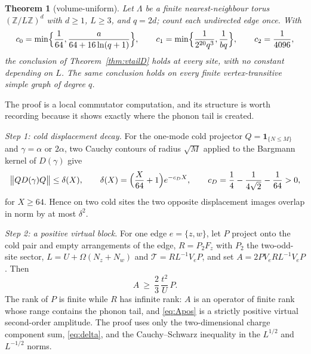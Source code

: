 \documentclass[11pt]{article}
\newtheorem{theorem}{Theorem}[section]
\theoremstyle{definition}
\theoremstyle{remark}
\begin{document}
\begin{theorem}[volume-uniform]\label{thm:vtailT}
Let $\Lambda$ be a finite nearest-neighbour torus $(\mathbb{Z}/L\mathbb{Z})^{d}$
with $d\ge1$, $L\ge3$, and $q=2d$; count each undirected edge once. With
\[
c_{0}=\min\Bigl\{\frac1{64},\frac{a}{64+16\ln(q+1)}\Bigr\},\qquad
c_{1}=\min\Bigl\{\frac1{2^{20}q^{3}},\frac1{bq}\Bigr\},\qquad
c_{2}=\frac1{4096},
\]
the conclusion of Theorem~\ref{thm:vtailD} holds at every site, with no constant
depending on $L$. The same conclusion holds on every finite vertex-transitive
simple graph of degree $q$.
\end{theorem}

The proof is a local commutator computation, and its structure is worth recording
because it shows exactly where the phonon tail is created.

\emph{Step 1: cold displacement decay.} For the one-mode cold projector
$Q=\mathbf{1}_{\{N\le M\}}$ and $\gamma=\alpha$ or $2\alpha$, two Cauchy contours
of radius $\sqrt M$ applied to the Bargmann kernel of $D(\gamma)$ give
\begin{equation}
\bigl\|QD(\gamma)Q\bigr\|\le\delta(X),\qquad
\delta(X)=\Bigl(\frac{X}{64}+1\Bigr)e^{-c_{D}X},\qquad
c_{D}=\frac14-\frac1{4\sqrt{2}}-\frac1{64}>0 ,
\label{eq:delta}
\end{equation}
for $X\ge64$. Hence on two cold sites the two opposite displacement images
overlap in norm by at most $\delta^{2}$.

\emph{Step 2: a positive virtual block.} For one edge $e=\{z,w\}$, let $P$ project
onto the cold pair and empty arrangements of the edge, $R=P_{2}F_{z}$ with $P_{2}$
the two-odd-site sector, $L=U+\Omega(N_{z}+N_{w})$ and
$\mathcal T=RL^{-1}V_{e}P$, and set $A=2PV_{e}RL^{-1}V_{e}P$. Then
\begin{equation}
A\ \ge\ \frac23\,\frac{t^{2}}{U}\,P .
\label{eq:Apos}
\end{equation}
The rank of $P$ is finite while $R$ has infinite rank: $A$ is an operator of
finite rank whose range contains the phonon tail, and \eqref{eq:Apos} is a
strictly positive virtual second-order amplitude. The proof uses only the
two-dimensional charge component sum, \eqref{eq:delta}, and the
Cauchy--Schwarz inequality in the $L^{1/2}$ and $L^{-1/2}$ norms.
\end{document}
